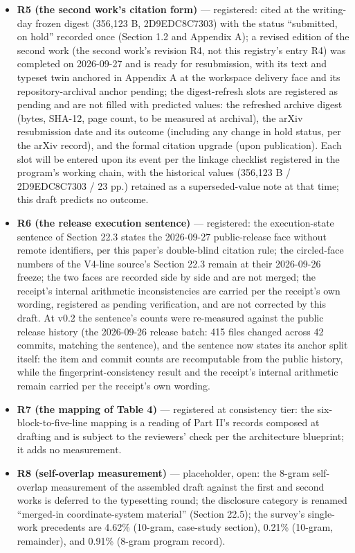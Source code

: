 \documentclass[11pt]{article}
\begin{document}
\begin{itemize}[leftmargin=1.6em,itemsep=2pt,parsep=0pt,topsep=3pt]
citations (E-40.1, E-40.2). The registration follows the R1–R3 precedent of concise, registered facts: the source documents are not transcribed, none of them enters the References, and the confidential-source discipline of C.4 is unaffected—the calibration note and the weekly-report family remain outside the citation surface, carried by fingerprint only.
\item \textbf{R5 (the second work's citation form)} — registered: cited at the writing-day frozen digest (356,123 B, 2D9EDC8C7303) with the status ``submitted, on hold'' recorded once (Section 1.2 and Appendix A); a revised edition of the second work (the second work's revision R4, not this registry's entry R4) was completed on 2026-09-27 and is ready for resubmission, with its text and typeset twin anchored in Appendix A at the workspace delivery face and its repository-archival anchor pending; the digest-refresh slots are registered as pending and are not filled with predicted values: the refreshed archive digest (bytes, SHA-12, page count, to be measured at archival), the arXiv resubmission date and its outcome (including any change in hold status, per the arXiv record), and the formal citation upgrade (upon publication). Each slot will be entered upon its event per the linkage checklist registered in the program's working chain, with the historical values (356,123 B / 2D9EDC8C7303 / 23 pp.) retained as a superseded-value note at that time; this draft predicts no outcome.
\item \textbf{R6 (the release execution sentence)} — registered: the execution-state sentence of Section 22.3 states the 2026-09-27 public-release face without remote identifiers, per this paper's double-blind citation rule; the circled-face numbers of the V4-line source's Section 22.3 remain at their 2026-09-26 freeze; the two faces are recorded side by side and are not merged; the receipt's internal arithmetic inconsistencies are carried per the receipt's own wording, registered as pending verification, and are not corrected by this draft. At v0.2 the sentence's counts were re-measured against the public release history (the 2026-09-26 release batch: 415 files changed across 42 commits, matching the sentence), and the sentence now states its anchor split itself: the item and commit counts are recomputable from the public history, while the fingerprint-consistency result and the receipt's internal arithmetic remain carried per the receipt's own wording.
\item \textbf{R7 (the mapping of Table 4)} — registered at consistency tier: the six-block-to-five-line mapping is a reading of Part II's records composed at drafting and is subject to the reviewers' check per the architecture blueprint; it adds no measurement.
\item \textbf{R8 (self-overlap measurement)} — placeholder, open: the 8-gram self-overlap measurement of the assembled draft against the first and second works is deferred to the typesetting round; the disclosure category is renamed ``merged-in coordinate-system material'' (Section 22.5); the survey's single-work precedents are 4.62\% (10-gram, case-study section), 0.21\% (10-gram, remainder), and 0.91\% (8-gram program record).
\end{itemize}
\end{document}
